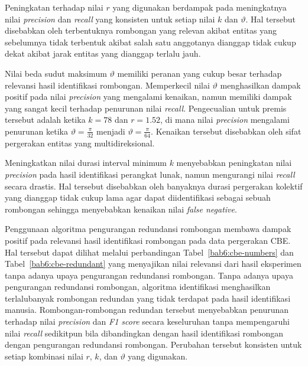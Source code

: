 Peningkatan terhadap nilai $r$ yang digunakan berdampak pada meningkatnya nilai \textit{precision} dan \textit{recall} yang konsisten untuk setiap nilai $k$ dan $\vartheta$. Hal tersebut disebabkan oleh terbentuknya rombongan yang relevan akibat entitas yang sebelumnya tidak terbentuk akibat salah satu anggotanya dianggap tidak cukup dekat akibat jarak entitas yang dianggap terlalu jauh.

Nilai beda sudut maksimum $\vartheta$ memiliki peranan yang cukup besar terhadap relevansi hasil identifikasi rombongan. Memperkecil nilai $\vartheta$ menghasilkan dampak positif pada nilai \textit{precision} yang mengalami kenaikan, namun memiliki dampak yang sangat kecil terhadap penurunan nilai \textit{recall}. Pengecualian untuk premis tersebut adalah ketika $k = 78$ dan $r = 1.52$, di mana nilai \textit{precision} mengalami penurunan ketika $\vartheta = \frac{\pi}{32}$ menjadi $\vartheta = \frac{\pi}{64}$. Kenaikan tersebut disebabkan oleh sifat pergerakan entitas yang multidireksional.

Meningkatkan nilai durasi interval minimum $k$ menyebabkan peningkatan nilai \textit{precision} pada hasil identifikasi perangkat lunak, namun mengurangi nilai \textit{recall} secara drastis. Hal tersebut disebabkan oleh banyaknya durasi pergerakan kolektif yang dianggap tidak cukup lama agar dapat diidentifikasi sebagai sebuah rombongan sehingga menyebabkan kenaikan nilai \textit{false negative}.

Penggunaan algoritma pengurangan redundansi rombongan membawa dampak positif pada relevansi hasil identifikasi rombongan pada data pergerakan CBE. Hal tersebut dapat dilihat melalui perbandingan Tabel~\ref{bab6:cbe-numbers} dan Tabel~\ref{bab6:cbe-redundant} yang menyajikan nilai relevansi dari hasil eksperimen tanpa adanya upaya pengurangan redundansi rombongan. Tanpa adanya upaya pengurangan redundansi rombongan, algoritma identifikasi menghasilkan terlalubanyak rombongan redundan yang tidak terdapat pada hasil identifikasi manusia. Rombongan-rombongan redundan tersebut menyebabkan penurunan terhadap nilai \textit{precision} dan \textit{F1 score} secara keseluruhan tanpa mempengaruhi nilai \textit{recall} sedikitpun bila dibandingkan dengan hasil identifikasi rombongan dengan pengurangan redundansi rombongan. Perubahan tersebut konsisten untuk setiap kombinasi nilai $r$, $k$, dan $\vartheta$ yang digunakan.



